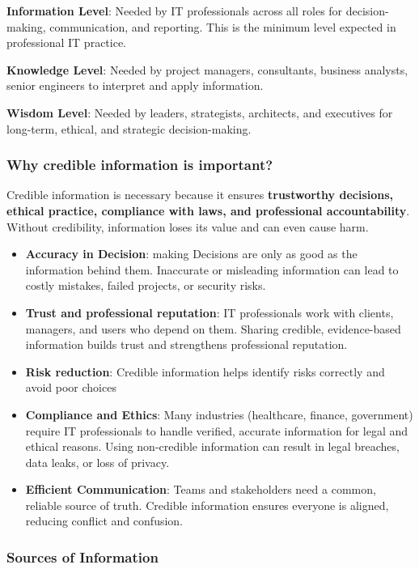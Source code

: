 \noindent\textbf{Information Level}: Needed by IT professionals across all roles for decision-making, communication, and reporting. This is the minimum level expected in professional IT practice.

\noindent\textbf{Knowledge Level}: Needed by project managers, consultants, business analysts, senior engineers to interpret and apply information.

\noindent\textbf{Wisdom Level}: Needed by leaders, strategists, architects, and executives for long-term, ethical, and strategic decision-making.

\subsubsection{Why credible information is important?}

\indent 

Credible information is necessary because it ensures \textbf{trustworthy decisions, ethical practice, compliance with laws, and professional accountability}. Without credibility, information loses its value and can even cause harm.

\begin{itemize}
    \item \textbf{Accuracy in Decision}: making Decisions are only as good as the information behind them. Inaccurate or misleading information can lead to costly mistakes, failed projects, or security risks.
    \item \textbf{Trust and professional reputation}: IT professionals work with clients, managers, and users who depend on them. Sharing credible, evidence-based information builds trust and strengthens professional reputation.
    \item \textbf{Risk reduction}: Credible information helps identify risks correctly and avoid poor choices
    \item \textbf{Compliance and Ethics}: Many industries (healthcare, finance, government) require IT professionals to handle verified, accurate information for legal and ethical reasons. Using non-credible information can result in legal breaches, data leaks, or loss of privacy.
    \item \textbf{Efficient Communication}: Teams and stakeholders need a common, reliable source of truth. Credible information ensures everyone is aligned, reducing conflict and confusion.
\end{itemize}

\subsubsection{Sources of Information}

